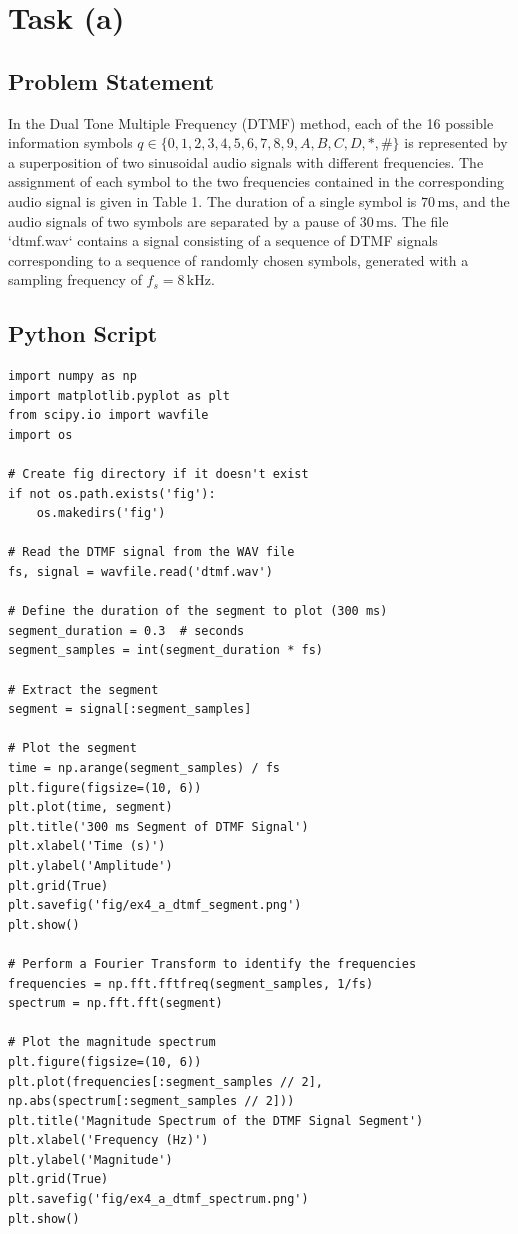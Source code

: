 \item[(a)]
\section*{Task (a)}

\subsection*{Problem Statement}
In the Dual Tone Multiple Frequency (DTMF) method, each of the 16 possible information symbols \( q \in \{0, 1, 2, 3, 4, 5, 6, 7, 8, 9, A, B, C, D, *, \#\} \) is represented by a superposition of two sinusoidal audio signals with different frequencies. The assignment of each symbol to the two frequencies contained in the corresponding audio signal is given in Table 1. The duration of a single symbol is \( 70 \, \text{ms} \), and the audio signals of two symbols are separated by a pause of \( 30 \, \text{ms} \). The file `dtmf.wav` contains a signal consisting of a sequence of DTMF signals corresponding to a sequence of randomly chosen symbols, generated with a sampling frequency of \( f_s = 8 \, \text{kHz} \).

\subsection*{Python Script}
\begin{verbatim}
import numpy as np
import matplotlib.pyplot as plt
from scipy.io import wavfile
import os

# Create fig directory if it doesn't exist
if not os.path.exists('fig'):
    os.makedirs('fig')

# Read the DTMF signal from the WAV file
fs, signal = wavfile.read('dtmf.wav')

# Define the duration of the segment to plot (300 ms)
segment_duration = 0.3  # seconds
segment_samples = int(segment_duration * fs)

# Extract the segment
segment = signal[:segment_samples]

# Plot the segment
time = np.arange(segment_samples) / fs
plt.figure(figsize=(10, 6))
plt.plot(time, segment)
plt.title('300 ms Segment of DTMF Signal')
plt.xlabel('Time (s)')
plt.ylabel('Amplitude')
plt.grid(True)
plt.savefig('fig/ex4_a_dtmf_segment.png')
plt.show()

# Perform a Fourier Transform to identify the frequencies
frequencies = np.fft.fftfreq(segment_samples, 1/fs)
spectrum = np.fft.fft(segment)

# Plot the magnitude spectrum
plt.figure(figsize=(10, 6))
plt.plot(frequencies[:segment_samples // 2], np.abs(spectrum[:segment_samples // 2]))
plt.title('Magnitude Spectrum of the DTMF Signal Segment')
plt.xlabel('Frequency (Hz)')
plt.ylabel('Magnitude')
plt.grid(True)
plt.savefig('fig/ex4_a_dtmf_spectrum.png')
plt.show()
\end{verbatim}

